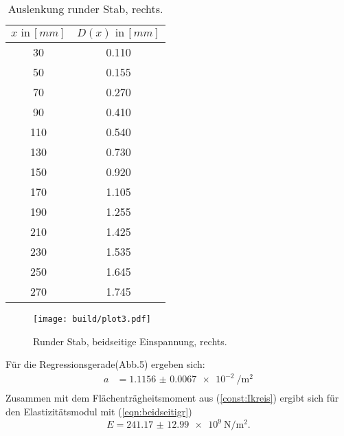 \begin{table}[h]
  \centering
  \label{tab:5}
  \begin{tabular}{ c c }
    \toprule
    $x \,\, \text{in} \, [mm]$
   &{$D(x) \,\, \text{in} \, [mm]$}\\

    \midrule
    30  & 0.110 \\%
    50  & 0.155 \\%
    70  & 0.270 \\%
    90  & 0.410 \\%
    110 & 0.540 \\%
    130 & 0.730 \\%
    150 & 0.920 \\%
    170 & 1.105 \\%
    190 & 1.255 \\%
    210 & 1.425 \\%
    230 & 1.535 \\%
    250 & 1.645 \\%
    270 & 1.745 \\%

    \bottomrule
  \end{tabular}
  \caption{Auslenkung runder Stab, rechts.}
\end{table}

\begin{figure}
  \centering
  \texttt{[image: build/plot3.pdf]}
  \caption{Runder Stab, beidseitige Einspannung, rechts.}
  \label{fig:plot3}
\end{figure}
Für die Regressionsgerade(Abb.5) ergeben sich:
\begin{align*}
  a &= \SI{1.1156(67)e-2}{\per\square\meter} \\
\end{align*}
Zusammen mit dem Flächenträgheitsmoment aus (\ref{const:Ikreis})
ergibt sich für den Elastizitätsmodul mit (\ref{eqn:beidseitigr})
\begin{equation*}
  E = \SI{241.17(1299)e9}{\newton\per\square\meter} .
\end{equation*}
\newpage

